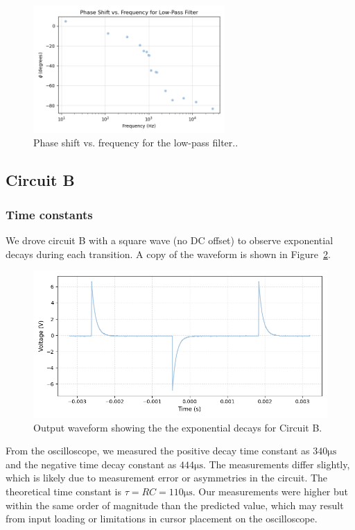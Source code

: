 \documentclass{article}
\begin{document}
\begin{figure}[H]
    \centering
    \includegraphics[width=0.65\textwidth]{2.1.cphase.png}
    \caption{Phase shift vs. frequency for the low-pass filter..}
    \label{fig:phase_lowpass}
\end{figure}



\subsection{Circuit B}

\subsubsection{Time constants}

We drove circuit B with a square wave (no DC offset) to observe exponential
decays during each transition. A copy of the waveform is shown in Figure~\ref{fig:b_time_constants}.

\begin{figure}[H]
    \centering
    \includegraphics[width=0.65\linewidth]{2.2.a.png}
    \caption{Output waveform showing the the exponential decays for Circuit B.}
    \label{fig:b_time_constants}
\end{figure}

\noindent From the oscilloscope, we measured the positive
decay time constant as $340\si{\micro\second}$ and the negative time decay
constant as $444\si{\micro\second}$. The measurements differ slightly, which
is likely due to measurement error or asymmetries in the circuit. The theoretical
time constant is $\tau = RC = 110\si{\micro\second}$. Our measurements 
were higher but within the same order of magnitude than the predicted value, which
may result from input loading or limitations in cursor placement on the oscilloscope.
\end{document}
